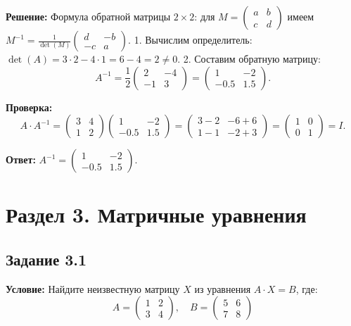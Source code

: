 \documentclass[11pt, a4paper]{article}
\begin{document}
\textbf{Решение:}
Формула обратной матрицы $2 \times 2$: для $M = \begin{pmatrix} a & b \\ c & d \end{pmatrix}$ имеем $M^{-1} = \frac{1}{\det(M)} \begin{pmatrix} d & -b \\ -c & a \end{pmatrix}$.
1. Вычислим определитель: $\det(A) = 3 \cdot 2 - 4 \cdot 1 = 6 - 4 = 2 \ne 0$.
2. Составим обратную матрицу:
$$ A^{-1} = \frac{1}{2} \begin{pmatrix} 2 & -4 \\ -1 & 3 \end{pmatrix} = \begin{pmatrix} 1 & -2 \\ -0.5 & 1.5 \end{pmatrix}. $$

\textbf{Проверка:}
$$ A \cdot A^{-1} = \begin{pmatrix} 3 & 4 \\ 1 & 2 \end{pmatrix} \begin{pmatrix} 1 & -2 \\ -0.5 & 1.5 \end{pmatrix} = \begin{pmatrix} 3-2 & -6+6 \\ 1-1 & -2+3 \end{pmatrix} = \begin{pmatrix} 1 & 0 \\ 0 & 1 \end{pmatrix} = I. $$

\textbf{Ответ:} $A^{-1} = \begin{pmatrix} 1 & -2 \\ -0.5 & 1.5 \end{pmatrix}$.

\newpage

\section{Раздел 3. Матричные уравнения}

\subsection*{Задание 3.1}
\textbf{Условие:} Найдите неизвестную матрицу $X$ из уравнения $A \cdot X = B$, где:
$$ A = \begin{pmatrix} 1 & 2 \\ 3 & 4 \end{pmatrix}, \quad B = \begin{pmatrix} 5 & 6 \\ 7 & 8 \end{pmatrix} $$
\end{document}
